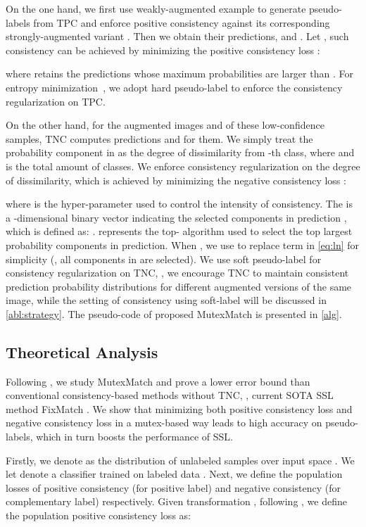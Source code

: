 \documentclass[lettersize,journal]{IEEEtran}
\theoremstyle{plain}
\theoremstyle{definition}
\theoremstyle{remark}
\begin{document}
On the one hand, we first use weakly-augmented example  to generate pseudo-labels from TPC and enforce positive consistency against its corresponding strongly-augmented variant . Then we obtain their predictions,  and .
Let , such consistency can be achieved by minimizing the positive consistency loss : 

where  retains the predictions whose maximum probabilities are larger than .  
For entropy minimization~\cite{lee2013pseudo}, we adopt hard pseudo-label  to enforce the consistency regularization on TPC.

On the other hand, for the augmented images  and  of these low-confidence samples, TNC computes predictions  and  for them. We simply treat the probability component  in  as the degree of dissimilarity from -th class, where  and  is the total amount  of classes. We enforce consistency regularization on the degree of dissimilarity, which is achieved by minimizing the negative consistency loss :

where  is the hyper-parameter used to control the intensity of consistency. 
The  is a -dimensional binary vector indicating the selected components in prediction , which is defined as: .  represents the top- algorithm used to select the top  largest probability components in prediction. When , we use  to replace term  in \cref{eq:ln} for simplicity (\ie, all components in  are selected).
We use soft pseudo-label  for consistency regularization on TNC, \ie, 
we encourage TNC to maintain consistent prediction probability distributions for different augmented versions of the same image, 
while the setting of consistency using soft-label will be discussed  in \cref{abl:strategy}. The pseudo-code of proposed MutexMatch is presented in  \cref{alg}.


\subsection{Theoretical Analysis}
Following \cite{wei2020theoretical}, we study MutexMatch and prove a lower error bound than conventional consistency-based methods without TNC, \eg, current SOTA SSL method FixMatch \cite{sohn2020fixmatch}. 
We show that minimizing both positive consistency loss and negative consistency loss in a mutex-based way leads to high accuracy on pseudo-labels, which in turn boosts the performance of SSL.

Firstly, we denote  as the distribution of unlabeled samples  over input space  . We let  denote a classifier trained on labeled data .
Next, we define the population losses of positive consistency (for positive label) and negative consistency (for complementary label) respectively. Given transformation , following \cite{wei2020theoretical}, we define the population positive consistency loss as:
\end{document}
